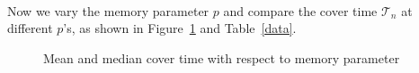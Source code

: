 \documentclass[
11pt, %
a4paper, %
oneside, %
headinclude,footinclude, %
BCOR5mm, %
]{scrartcl}
\begin{document}
\vspace{0.6em}\\Now we vary the memory parameter $p$ and compare the cover time $\mathcal{T}_n$ at different $p$'s, as shown in Figure~\ref{5060} and Table~\ref{data}. 
\begin{figure}[h]
    \centering
    \caption{Mean and median cover time with respect to memory parameter}
    \label{5060}
\end{figure}
\makeatletter
\setlength{\@fptop}{5pt}
\makeatother
\end{document}
